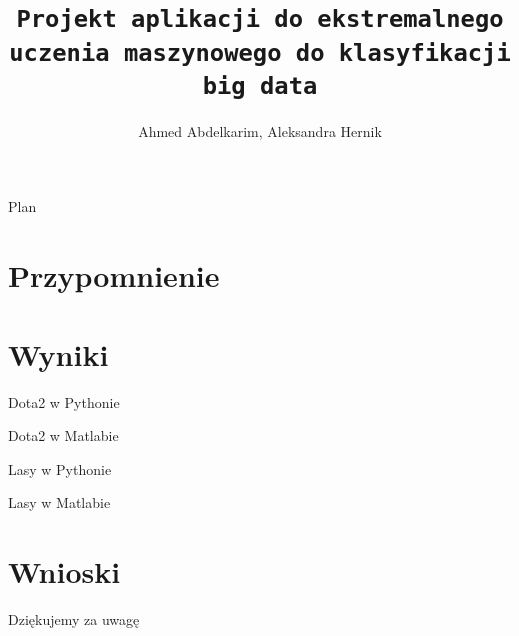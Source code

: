 \documentclass{beamer}
\title{\texttt{Projekt aplikacji do ekstremalnego uczenia maszynowego do klasyfikacji big data}}
\author{Ahmed Abdelkarim, Aleksandra Hernik}
\begin{document}


\begin{frame}
  \maketitle
\end{frame}

\begin{frame}{Plan}
  \tableofcontents[currentsection]
\end{frame}

\section{Przypomnienie}

\section{Wyniki}
\begin{frame}{Dota2 w Pythonie}

\end{frame}

\begin{frame}{Dota2 w Matlabie}

\end{frame}

\begin{frame}{Lasy w Pythonie}

\end{frame}

\begin{frame}{Lasy w Matlabie}

\end{frame}

\section{Wnioski}
\begin{frame}{}

\end{frame}

\begin{frame}
\begin{center}
\huge{Dziękujemy za uwagę}
\end{center}

\end{frame}
\end{document}
